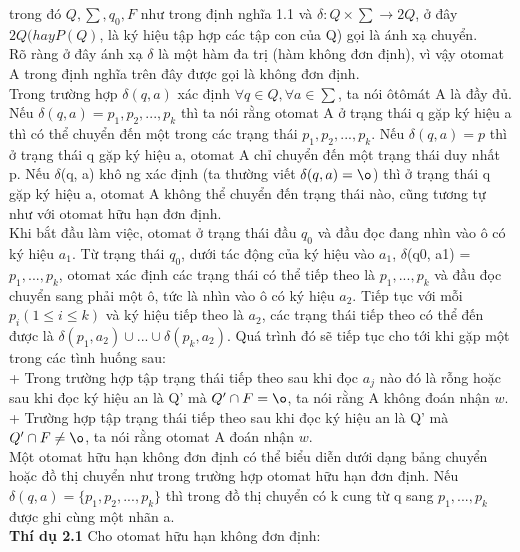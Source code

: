 \begin{flushleft}
trong đó $Q, \sum, q_0, F$ như trong định nghĩa 1.1 và $\delta: Q \times \sum \to 2Q$, ở đây $2Q (hay P(Q)$, là ký hiệu tập hợp các tập con của Q) gọi là ánh xạ chuyển.\\
Rõ ràng ở đây ánh xạ $\delta$ là một hàm đa trị (hàm không đơn định), vì vậy otomat A trong định nghĩa trên đây được gọi là không đơn định.\\
Trong trường hợp $\delta(q, a)$ xác định $\forall q \in Q, \forall a \in \sum$, ta nói ôtômát A là đầy đủ.\\
\hspace{10mm}Nếu $\delta(q, a) = {p_1, p_2,..., p_k}$ thì ta nói rằng otomat A ở trạng thái q gặp ký hiệu a thì có thể chuyển đến một trong các trạng thái $p_1, p_2,..., p_k$. Nếu $\delta(q, a) = {p}$ thì ở trạng thái q gặp ký hiệu a, otomat A chỉ chuyển đến một trạng thái duy nhất p. Nếu $\delta$(q, a) khô ng xác định (ta thường viết $\delta(q, a) = \o $) thì ở trạng thái q gặp ký hiệu a, otomat A không thể chuyển đến trạng thái nào, cũng tương tự như với otomat hữu hạn đơn định.\\
\hspace{10mm}Khi bắt đầu làm việc, otomat ở trạng thái đầu $q_0$ và đầu đọc đang nhìn vào ô có ký hiệu $a_1$. Từ trạng thái $q_0$, dưới tác động của ký hiệu vào $a_1$, $\delta$(q0, a1) = {$p_1,..., p_k$}, otomat xác định các trạng thái có thể tiếp theo là $p_1,..., p_k$ và đầu đọc chuyển sang phải một ô, tức là nhìn vào ô có ký hiệu $a_2$. Tiếp tục với mỗi $p_i (1 \le i \le k)$ và ký hiệu tiếp theo là $a_2$, các trạng thái tiếp theo có thể đến được là $\delta(p_1, a_2)\cup...\cup \delta(p_k, a_2)$. Quá trình đó sẽ tiếp tục cho tới khi gặp một trong các tình huống sau:\\
+ Trong trường hợp tập trạng thái tiếp theo sau khi đọc $a_j$ nào đó là rỗng hoặc sau khi đọc ký hiệu an là Q' mà $Q' \cap F = \o$, ta nói rằng A không đoán nhận $w$.\\
+ Trường hợp tập trạng thái tiếp theo sau khi đọc ký hiệu an là Q' mà $Q' \cap F \ne \o$, ta nói rằng otomat A đoán nhận $w$.\\
Một otomat hữu hạn không đơn định có thể biểu diễn dưới dạng bảng chuyển hoặc đồ thị chuyển như trong trường hợp otomat hữu hạn đơn định. Nếu $\delta(q, a) = \{p_1, p_2, ..., p_k\}$ thì trong đồ thị chuyển có k cung từ q sang $p_1, ..., p_k$ được ghi cùng một nhãn a. \\
\textbf{Thí dụ 2.1} Cho otomat hữu hạn không đơn định:\\

\end{flushleft}
